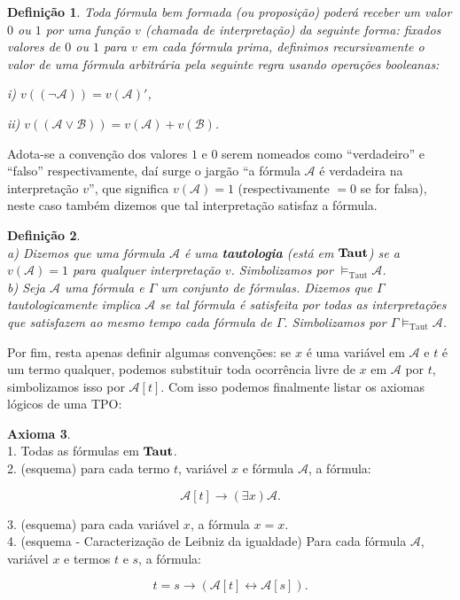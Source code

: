 \documentclass[11pt,a4paper]{article}
\newtheorem{mydef}{Definição}[section]
\theoremstyle{definition}
\newtheorem{axi}[mydef]{Axioma}
\begin{document}
\begin{mydef}
	
	Toda fórmula bem formada (ou proposição) poderá receber um valor $0$ ou $1$ por uma função $v$ (chamada de interpretação) da seguinte forma: fixados valores de $0$ ou $1$ para $v$ em cada fórmula prima, definimos recursivamente o valor de uma fórmula arbitrária pela seguinte regra usando operações booleanas:
	
	i) $v((\neg \mathscr{A}))=v(\mathscr{A})'$,
	
	ii) $v((\mathscr{A}\vee \mathscr{B}))=v(\mathscr{A}) + v(\mathscr{B})$.
	
\end{mydef}

Adota-se a convenção dos valores $1$ e $0$ serem nomeados como ``verdadeiro'' e ``falso'' respectivamente, daí surge o jargão ``a fórmula $\mathscr{A}$ é verdadeira na interpretação $v$'', que significa $v(\mathscr{A})=1$ (respectivamente $=0$ se for falsa), neste caso também dizemos que tal interpretação satisfaz a fórmula.


\begin{mydef} \ \\
	
	a) Dizemos que uma fórmula $\mathscr{A}$  é uma \textbf{tautologia} (está em $\textrm{\textbf{Taut}}$) se a $v(\mathscr{A})=1$ para qualquer interpretação $v$. Simbolizamos por $\vDash_{\textrm{Taut}} \mathscr{A}$. \\
	
	b) Seja $\mathscr{A}$ uma fórmula e $\Gamma$ um conjunto de fórmulas. Dizemos que $\Gamma$ tautologicamente implica $\mathscr{A}$ se tal fórmula é satisfeita por todas as interpretações que satisfazem ao mesmo tempo cada fórmula de $\Gamma$. Simbolizamos por $\Gamma \vDash_{\textrm{Taut}} \mathscr{A}$.
	
\end{mydef}

Por fim, resta apenas definir algumas convenções: se $x$ é uma variável em $\mathscr{A}$ e $t$ é um termo qualquer, podemos substituir toda ocorrência livre de $x$ em $\mathscr{A}$ por $t$, simbolizamos isso por $\mathscr{A}[t]$. Com isso podemos finalmente listar os axiomas lógicos de uma TPO: 

\begin{axi} \ \\
	
	1. Todas as fórmulas em $\textrm{\textbf{Taut}}$. \\
	
	2. (esquema) para cada termo $t$, variável $x$ e fórmula $\mathscr{A}$, a fórmula:
	
	$$\mathscr{A}[t]\rightarrow (\exists x)\mathscr{A}.$$ 
	
	3. (esquema) para cada variável $x$, a fórmula $x=x$. \\
	
	4. (esquema - Caracterização de Leibniz da igualdade) Para cada fórmula $\mathscr{A}$, variável $x$ e termos $t$ e $s$, a fórmula: 
	
	$$t=s\rightarrow (\mathscr{A}[t]\leftrightarrow \mathscr{A}[s]).$$
	
	
	
\end{axi}
\end{document}
